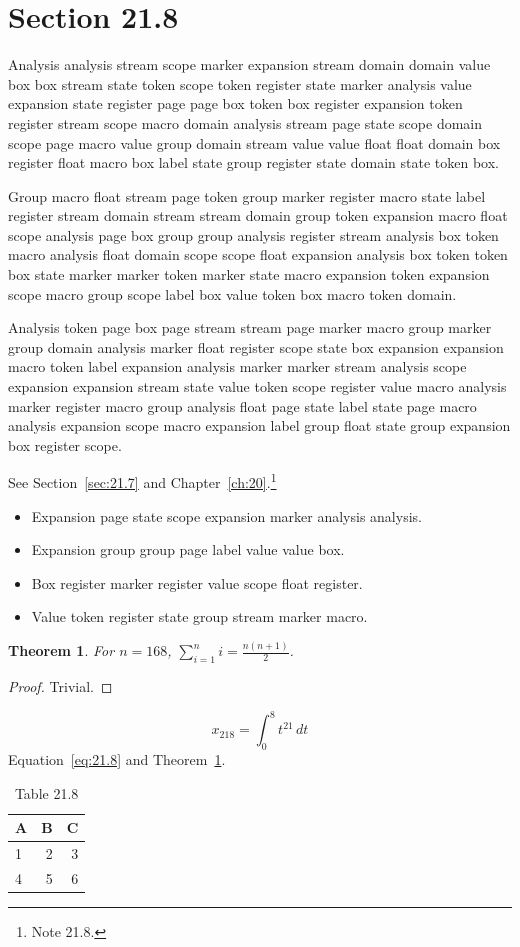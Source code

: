 \documentclass[11pt,twoside]{book}
\newtheorem{theorem}{Theorem}[chapter]
\begin{document}
\section{Section 21.8}\label{sec:21.8}
Analysis analysis stream scope marker expansion stream domain domain value box box stream state token scope token register state marker analysis value expansion state register page page box token box register expansion token register stream scope macro domain analysis stream page state scope domain scope page macro value group domain stream value value float float domain box register float macro box label state group register state domain state token box.

Group macro float stream page token group marker register macro state label register stream domain stream stream domain group token expansion macro float scope analysis page box group group analysis register stream analysis box token macro analysis float domain scope scope float expansion analysis box token token box state marker marker token marker state macro expansion token expansion scope macro group scope label box value token box macro token domain.

Analysis token page box page stream stream page marker macro group marker group domain analysis marker float register scope state box expansion expansion macro token label expansion analysis marker marker stream analysis scope expansion expansion stream state value token scope register value macro analysis marker register macro group analysis float page state label state page macro analysis expansion scope macro expansion label group float state group expansion box register scope.

See Section~\ref{sec:21.7} and Chapter~\ref{ch:20}.\footnote{Note 21.8.}
\begin{itemize}\item Expansion page state scope expansion marker analysis analysis.\item Expansion group group page label value value box.\item Box register marker register value scope float register.\item Value token register state group stream marker macro.\end{itemize}
\begin{theorem}\label{thm:21.8}For $n=168$, $\sum_{i=1}^{n}i=\frac{n(n+1)}{2}$.\end{theorem}\begin{proof}Trivial.\end{proof}
\begin{equation}x_{218}=\int_0^{8}t^{21}\,dt\label{eq:21.8}\end{equation} Equation~\eqref{eq:21.8} and Theorem~\ref{thm:21.8}.
\begin{table}[ht]\centering\caption{Table 21.8}\begin{tabular}{lrr}\toprule A&B&C\\\midrule 1&2&3\\ 4&5&6\\\bottomrule\end{tabular}\end{table}
\end{document}
